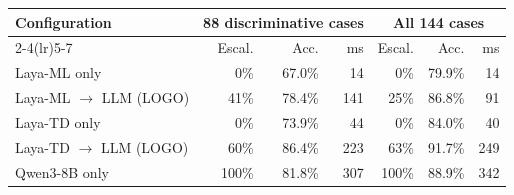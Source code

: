 \begin{tabular}{lrrrrrr}
\toprule
Configuration & \multicolumn{3}{c}{88 discriminative cases} & \multicolumn{3}{c}{All 144 cases}  \\ \cmidrule(lr){2-4}\cmidrule(lr){5-7} & Escal. & Acc. & ms & Escal. & Acc. & ms \\
\midrule
Laya-ML only & 0\% & 67.0\% & 14 & 0\% & 79.9\% & 14 \\
Laya-ML $\to$ LLM (LOGO) & 41\% & 78.4\% & 141 & 25\% & 86.8\% & 91 \\
Laya-TD only & 0\% & 73.9\% & 44 & 0\% & 84.0\% & 40 \\
Laya-TD $\to$ LLM (LOGO) & 60\% & 86.4\% & 223 & 63\% & 91.7\% & 249 \\
Qwen3-8B only & 100\% & 81.8\% & 307 & 100\% & 88.9\% & 342 \\
\bottomrule
\end{tabular}
